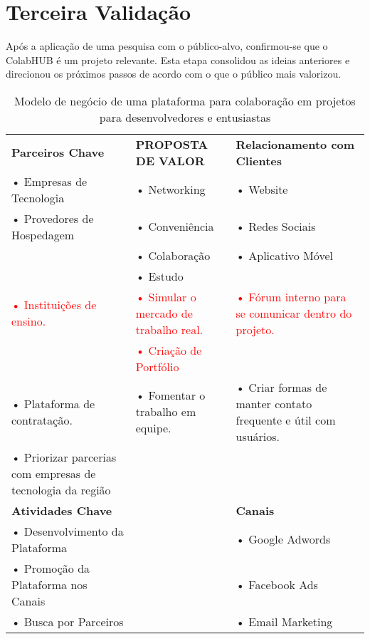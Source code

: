 \documentclass{article}
\begin{document}
\newpage

\section*{Terceira Validação}
Após a aplicação de uma pesquisa com o público-alvo, confirmou-se que o ColabHUB é um projeto relevante. Esta etapa consolidou as ideias anteriores e direcionou os próximos passos de acordo com o que o público mais valorizou.

\vspace{0.5cm}

\begin{table}[H]
\centering
\caption{Modelo de negócio de uma plataforma para colaboração em projetos para desenvolvedores e entusiastas}
\renewcommand{\arraystretch}{1.8}
\setlength{\tabcolsep}{4pt}
\begin{tabular}{|p{6cm}|p{6cm}|p{6cm}|}
\hline
\rowcolor{lightgray}
\textbf{Parceiros Chave} &
\centering\textbf{PROPOSTA DE VALOR} &
\textbf{Relacionamento com Clientes} \\
\cline{1-1}\cline{2-2}\cline{3-3}
• Empresas de Tecnologia & • Networking & • Website \\
• Provedores de Hospedagem & • Conveniência & • Redes Sociais \\
& • Colaboração & • Aplicativo Móvel \\
& • Estudo & \\
\textcolor{red}{• Instituições de ensino.} &
\textcolor{red}{• Simular o mercado de trabalho real.} &
\textcolor{red}{• Fórum interno para se comunicar dentro do projeto.} \\
& \textcolor{red}{• Criação de Portfólio} & \\
\textcolor{blueval}{• Plataforma de contratação.} &
\textcolor{blueval}{• Fomentar o trabalho em equipe.} &
\textcolor{blueval}{• Criar formas de manter contato frequente e útil com usuários.} \\
\textcolor{blueval}{• Priorizar parcerias com empresas de tecnologia da região} & & \\
\hline
\rowcolor{lightgray}
\textbf{Atividades Chave} & & \textbf{Canais} \\
\cline{1-1}\cline{2-2}\cline{3-3}
• Desenvolvimento da Plataforma & & • Google Adwords \\
• Promoção da Plataforma nos Canais & & • Facebook Ads \\
• Busca por Parceiros & & • Email Marketing \\

\end{tabular}
\end{table}
\end{document}

